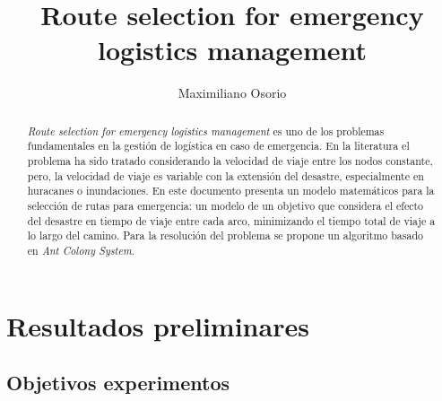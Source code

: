 \documentclass{llncs}
\begin{document}
%
\frontmatter          %
%
\pagestyle{headings}  %

\title{Route selection for emergency logistics management}
%
%
\author{Maximiliano Osorio}
%
%
%

\maketitle              %


\begin{abstract}
\textit{Route selection for emergency logistics management} es uno de los problemas fundamentales en la gestión de logística en caso de emergencia. En la literatura el problema ha sido tratado considerando la velocidad de viaje entre los nodos constante, pero, la velocidad de viaje es variable con la extensión del desastre, especialmente en huracanes o inundaciones.
En este documento presenta un modelo matemáticos para la selección de rutas para emergencia: un modelo de un objetivo que considera el efecto del desastre en tiempo de viaje entre cada arco,  minimizando el tiempo total de viaje a lo largo del camino. Para la resolución del problema se propone un algoritmo basado en  \textit{Ant Colony System}.


\end{abstract}
%





\section{Resultados preliminares}
\subsection{Objetivos experimentos}
\end{document}
